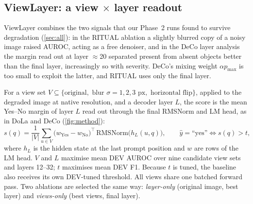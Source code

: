 \documentclass[10pt,a4paper]{article}
\newcommand{\ours}{ViewLayer}
\begin{document}
\subsection{\ours{}: a view \texorpdfstring{$\times$}{x} layer readout}\label{sec:viewlayer}
\ours{} combines the two signals that our Phase~2 runs found to survive degradation (\cref{sec:all}): in the RITUAL ablation a slightly blurred copy of a noisy image raised AUROC, acting as a free denoiser, and in the DeCo layer analysis the margin read out at layer $\approx$20 separated present from absent objects better than the final layer, increasingly so with severity. DeCo's mixing weight $\alpha p_{\max}$ is too small to exploit the latter, and RITUAL uses only the final layer.

For a view set $V\subseteq\{\text{original},\text{ blur }\sigma{=}1,2,3\text{ px},\text{ horizontal flip}\}$, applied to the degraded image at native resolution, and a decoder layer $L$, the score is the mean Yes--No margin of layer $L$ read out through the final RMSNorm and LM head, as in DoLa and DeCo (\cref{fig:method}):
\begin{equation}
s(q)=\frac{1}{|V|}\sum_{u\in V}\big(w_{\text{Yes}}-w_{\text{No}}\big)^{\!\top}\,\mathrm{RMSNorm}\big(h_L(u,q)\big),\qquad \hat y=\text{``yes''}\iff s(q)>t,
\label{eq:viewlayer}
\end{equation}
where $h_L$ is the hidden state at the last prompt position and $w$ are rows of the LM head. $V$ and $L$ maximise mean DEV AUROC over nine candidate view sets and layers 12--32; $t$ maximises mean DEV F1. Because $t$ is tuned, the baseline also receives its own DEV-tuned threshold. All views share one batched forward pass. Two ablations are selected the same way: \emph{layer-only} (original image, best layer) and \emph{views-only} (best views, final layer).
\end{document}
